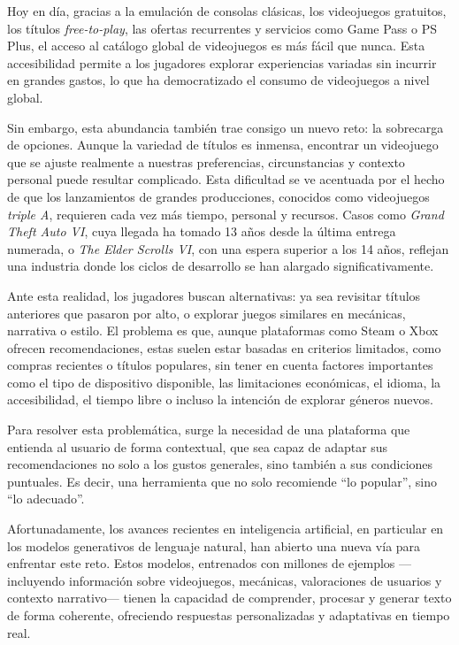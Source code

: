 Hoy en día, gracias a la emulación de consolas clásicas, los videojuegos gratuitos, los títulos \textit{free-to-play}, las ofertas recurrentes y servicios como Game Pass o PS Plus, el acceso al catálogo global de videojuegos es más fácil que nunca. Esta accesibilidad permite a los jugadores explorar experiencias variadas sin incurrir en grandes gastos, lo que ha democratizado el consumo de videojuegos a nivel global.

Sin embargo, esta abundancia también trae consigo un nuevo reto: la sobrecarga de opciones. Aunque la variedad de títulos es inmensa, encontrar un videojuego que se ajuste realmente a nuestras preferencias, circunstancias y contexto personal puede resultar complicado. Esta dificultad se ve acentuada por el hecho de que los lanzamientos de grandes producciones, conocidos como videojuegos \textit{triple A}, requieren cada vez más tiempo, personal y recursos. Casos como \textit{Grand Theft Auto VI}, cuya llegada ha tomado 13 años desde la última entrega numerada, o \textit{The Elder Scrolls VI}, con una espera superior a los 14 años, reflejan una industria donde los ciclos de desarrollo se han alargado significativamente.

Ante esta realidad, los jugadores buscan alternativas: ya sea revisitar títulos anteriores que pasaron por alto, o explorar juegos similares en mecánicas, narrativa o estilo. El problema es que, aunque plataformas como Steam o Xbox ofrecen recomendaciones, estas suelen estar basadas en criterios limitados, como compras recientes o títulos populares, sin tener en cuenta factores importantes como el tipo de dispositivo disponible, las limitaciones económicas, el idioma, la accesibilidad, el tiempo libre o incluso la intención de explorar géneros nuevos.

Para resolver esta problemática, surge la necesidad de una plataforma que entienda al usuario de forma contextual, que sea capaz de adaptar sus recomendaciones no solo a los gustos generales, sino también a sus condiciones puntuales. Es decir, una herramienta que no solo recomiende “lo popular”, sino “lo adecuado”.

Afortunadamente, los avances recientes en inteligencia artificial, en particular en los modelos generativos de lenguaje natural, han abierto una nueva vía para enfrentar este reto. Estos modelos, entrenados con millones de ejemplos —incluyendo información sobre videojuegos, mecánicas, valoraciones de usuarios y contexto narrativo— tienen la capacidad de comprender, procesar y generar texto de forma coherente, ofreciendo respuestas personalizadas y adaptativas en tiempo real.

